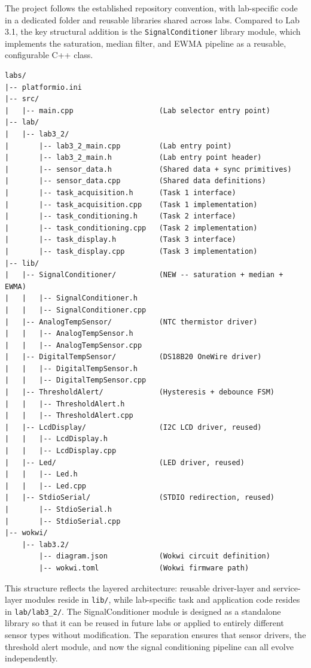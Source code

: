 The project follows the established repository convention, with lab-specific code in a dedicated folder and reusable libraries shared across labs. Compared to Lab 3.1, the key structural addition is the \texttt{SignalConditioner} library module, which implements the saturation, median filter, and EWMA pipeline as a reusable, configurable C++ class.

\begin{lstlisting}[caption=Project directory structure for Lab 3.2, label=lst:project_structure]
labs/
|-- platformio.ini
|-- src/
|   |-- main.cpp                    (Lab selector entry point)
|-- lab/
|   |-- lab3_2/
|       |-- lab3_2_main.cpp         (Lab entry point)
|       |-- lab3_2_main.h           (Lab entry point header)
|       |-- sensor_data.h           (Shared data + sync primitives)
|       |-- sensor_data.cpp         (Shared data definitions)
|       |-- task_acquisition.h      (Task 1 interface)
|       |-- task_acquisition.cpp    (Task 1 implementation)
|       |-- task_conditioning.h     (Task 2 interface)
|       |-- task_conditioning.cpp   (Task 2 implementation)
|       |-- task_display.h          (Task 3 interface)
|       |-- task_display.cpp        (Task 3 implementation)
|-- lib/
|   |-- SignalConditioner/          (NEW -- saturation + median + EWMA)
|   |   |-- SignalConditioner.h
|   |   |-- SignalConditioner.cpp
|   |-- AnalogTempSensor/           (NTC thermistor driver)
|   |   |-- AnalogTempSensor.h
|   |   |-- AnalogTempSensor.cpp
|   |-- DigitalTempSensor/          (DS18B20 OneWire driver)
|   |   |-- DigitalTempSensor.h
|   |   |-- DigitalTempSensor.cpp
|   |-- ThresholdAlert/             (Hysteresis + debounce FSM)
|   |   |-- ThresholdAlert.h
|   |   |-- ThresholdAlert.cpp
|   |-- LcdDisplay/                 (I2C LCD driver, reused)
|   |   |-- LcdDisplay.h
|   |   |-- LcdDisplay.cpp
|   |-- Led/                        (LED driver, reused)
|   |   |-- Led.h
|   |   |-- Led.cpp
|   |-- StdioSerial/                (STDIO redirection, reused)
|       |-- StdioSerial.h
|       |-- StdioSerial.cpp
|-- wokwi/
    |-- lab3.2/
        |-- diagram.json            (Wokwi circuit definition)
        |-- wokwi.toml              (Wokwi firmware path)
\end{lstlisting}

This structure reflects the layered architecture: reusable driver-layer and service-layer modules reside in \texttt{lib/}, while lab-specific task and application code resides in \texttt{lab/lab3\_2/}. The SignalConditioner module is designed as a standalone library so that it can be reused in future labs or applied to entirely different sensor types without modification. The separation ensures that sensor drivers, the threshold alert module, and now the signal conditioning pipeline can all evolve independently.

